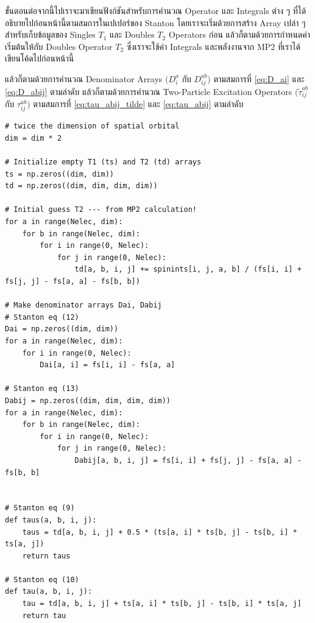 \vspace{5pt}

\noindent ขั้นตอนต่อจากนี้ไปเราจะมาเขียนฟังก์ชันสำหรับการคำนวณ Operator และ Integrals ต่าง ๆ ที่ได้อธิบายไปก่อนหน้านี้ตามสมการในเปเปอร์ของ Stanton โดยเราจะเริ่มด้วยการสร้าง Array เปล่า ๆ สำหรับเก็บข้อมูลของ Singles $T_{1}$ และ Doubles $T_{2}$ Operators ก่อน แล้วก็ตามด้วยการกำหนดค่าเริ่มต้นให้กับ Doubles Operator $T_{2}$ ซึ่งเราจะใช้ค่า Integrals และพลังงานจาก MP2 ที่เราได้เขียนโค้ดไปก่อนหน้านี้

\noindent แล้วก็ตามด้วยการคำนวณ Denominator Arrays $(D^{a}_{i}$ กับ $D^{ab}_{ij})$ ตามสมการที่ \eqref{eq:D_ai} และ \eqref{eq:D_abij} ตามลำดับ แล้วก็ตามด้วยการคำนวณ Two-Particle Excitation Operators $(\tilde{\tau}_{i j}^{a b}$ กับ $\tau_{i j}^{a b})$ ตามสมการที่ \eqref{eq:tau_abij_tilde} และ \eqref{eq:tau_abij} ตามลำดับ

\vspace{5pt}

\begin{lstlisting}[style=MyPython]
# twice the dimension of spatial orbital
dim = dim * 2

# Initialize empty T1 (ts) and T2 (td) arrays
ts = np.zeros((dim, dim))
td = np.zeros((dim, dim, dim, dim))

# Initial guess T2 --- from MP2 calculation!
for a in range(Nelec, dim):
    for b in range(Nelec, dim):
        for i in range(0, Nelec):
            for j in range(0, Nelec):
                td[a, b, i, j] += spinints[i, j, a, b] / (fs[i, i] + fs[j, j] - fs[a, a] - fs[b, b])

# Make denominator arrays Dai, Dabij
# Stanton eq (12)
Dai = np.zeros((dim, dim))
for a in range(Nelec, dim):
    for i in range(0, Nelec):
        Dai[a, i] = fs[i, i] - fs[a, a]

# Stanton eq (13)
Dabij = np.zeros((dim, dim, dim, dim))
for a in range(Nelec, dim):
    for b in range(Nelec, dim):
        for i in range(0, Nelec):
            for j in range(0, Nelec):
                Dabij[a, b, i, j] = fs[i, i] + fs[j, j] - fs[a, a] - fs[b, b]


# Stanton eq (9)
def taus(a, b, i, j):
    taus = td[a, b, i, j] + 0.5 * (ts[a, i] * ts[b, j] - ts[b, i] * ts[a, j])
    return taus

# Stanton eq (10)
def tau(a, b, i, j):
    tau = td[a, b, i, j] + ts[a, i] * ts[b, j] - ts[b, i] * ts[a, j]
    return tau
\end{lstlisting}

\vspace{5pt}

